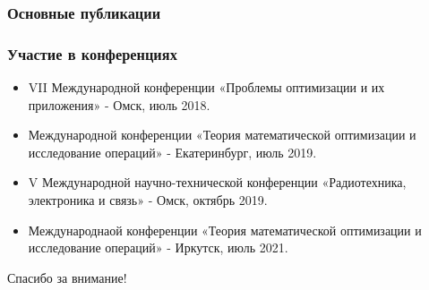 
 \begin{frame}[t,allowframebreaks] %
    \frametitle{Основные публикации}
    \nocite{tyu:daor}%
    \nocite{tyu22:reis}%
    \nocite{tyu:jphys}%
    \nocite{tyu:fmh}%
    \nocite{tyu:reis}%
    \nocite{tyu:opta}%
    \nocite{tyu:motor}%
\end{frame}

\begin{frame}
    \frametitle{Участие в конференциях}
    \begin{itemize}
      \item VII Международной конференции «Проблемы оптимизации и их приложения» - Омск, июль 2018.
      \item Международной конференции «Теория математической оптимизации и исследование операций» - Екатеринбург, июль 2019.
      \item V Международной научно-технической конференции «Радиотехника, электроника и связь» - Омск, октябрь 2019.
      \item Международнаой конференции «Теория математической оптимизации и исследование операций» - Иркутск, июль 2021.
    \end{itemize}
\end{frame}

\begin{frame} %
    \begin{center}
        \Huge
        Спасибо за внимание!
    \end{center}
\end{frame}
